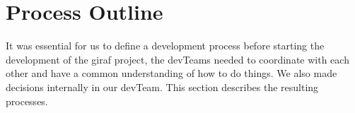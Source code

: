 \chapter{Process Outline}

It was essential for us to define a development process before starting the development of the \gls{giraf} project, the \glspl{devTeam} needed to coordinate with each other and have a common understanding of how to do  things. We also made decisions internally in our \gls{devTeam}. This section describes the resulting processes. 
